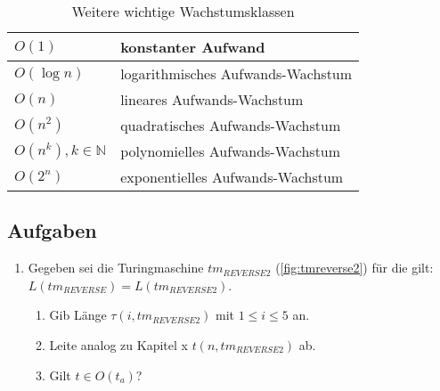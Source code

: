 \begin{table}[ht]
    \caption{Weitere wichtige Wachstumsklassen}
    \centering
    \begin{tabular}{l l}
        \toprule
        $O(1)$ & konstanter Aufwand \\
        \midrule
        $O(\log n)$ & logarithmisches Aufwands-Wachstum \\
        \midrule
        $O(n)$ & lineares Aufwands-Wachstum \\
        \midrule
        $O(n^2)$ & quadratisches Aufwands-Wachstum \\
        \midrule
        $O(n^k),  k \in \mathbb{N}$ & polynomielles Aufwands-Wachstum \\
        \midrule
        $O(2^n)$ & exponentielles Aufwands-Wachstum \\
    \bottomrule
    \bottomrule
    \end{tabular}%
    \label{tab:oklassen}
\end{table}


\subsection*{Aufgaben}

\begin{enumerate}
    \item Gegeben sei die Turingmaschine $tm_{REVERSE2}$ (\autoref{fig:tmreverse2}) für die gilt: $L(tm_{REVERSE}) = L(tm_{REVERSE2})$.
            \begin{enumerate}
                \item Gib Länge $\tau(i, tm_{REVERSE2})$ mit $1 \leq i \leq 5$ an.
                \item Leite analog zu Kapitel x $t(n, tm_{REVERSE2})$ ab.
                \item Gilt $t \in O(t_{a})$?
            \end{enumerate}
\end{enumerate}

